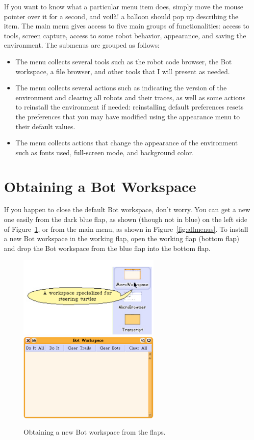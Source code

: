 \documentclass[a4paper,10pt,twoside]{book}
\begin{document}
If you want to know what a particular menu item does, simply move the mouse pointer 
over it for a second, and voil\`a! a balloon should pop up describing the item. The main menu 
gives access to five main groups of functionalities: access to tools, screen capture, access to 
some robot behavior, appearance, and saving the environment. The submenus are grouped 
as follows: 
\begin{itemize}
\item The  menu collects several tools such as the robot code browser, the Bot workspace, a file browser, and other tools that I will present as needed. 

\item The  menu collects several actions such as indicating the version of the 
environment and clearing all robots and their traces, as well as some actions to reinstall 
the environment if needed: reinstalling default preferences resets the preferences that 
you may have modified using the appearance menu to their default values. 

\item  The  menu collects actions that change the appearance of the environment 
such as fonts used, full-screen mode, and background color. 
\end{itemize}


\section{Obtaining a Bot Workspace}
If you happen to close the default Bot workspace, don’t worry. You can get a new one easily 
from the dark blue flap, as shown (though not in blue) on the left side of Figure~\ref{fig:caroflaps}, or from 
the main menu, as shown in Figure~\ref{fig:allmenus}. To install a new Bot workspace in the working flap, 
open the working flap (bottom flap) and drop the Bot workspace from the blue flap into the 
bottom flap. 


\begin{figure}[!h]
\begin{center}
\includegraphics[width=7cm]{smallcaroflap}\hfill\includegraphics[width=7cm]{FullTurtleWorkspace}
\caption{Obtaining a new Bot workspace from the flaps. \label{fig:caroflaps}}
\end{center}
\end{figure}
\end{document}
